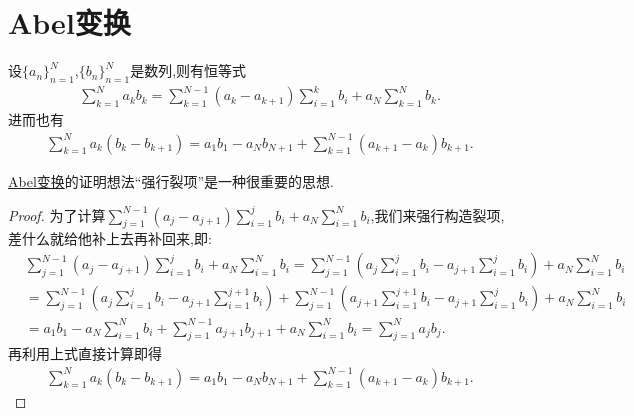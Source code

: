 \documentclass[../../main.tex]{subfiles}%
\begin{document}
\section{Abel变换}

\begin{theorem}[Abel变换]\label{theorem:Abel变换}
设\(\{a_n\}_{n = 1}^{N}\),\(\{b_n\}_{n = 1}^{N}\)是数列,则有恒等式
\begin{align*}
\sum\limits_{k = 1}^{N} a_k b_k = \sum\limits_{k = 1}^{N - 1} (a_k - a_{k + 1}) \sum\limits_{i = 1}^{k} b_i + a_N \sum\limits_{k = 1}^{N} b_k.
\end{align*}
进而也有
\begin{align*}
\sum_{k=1}^N{a_k\left( b_k-b_{k+1} \right)}=a_1b_1-a_Nb_{N+1}+\sum_{k=1}^{N-1}{\left( a_{k+1}-a_k \right) b_{k+1}}.
\end{align*}
\end{theorem}
\begin{note}
\hyperref[theorem:Abel变换]{Abel变换}的证明想法“强行裂项”是一种很重要的思想.
\end{note}
\begin{proof}
为了计算\(\sum\limits_{j = 1}^{N - 1} (a_j - a_{j + 1}) \sum\limits_{i = 1}^{j} b_i + a_N \sum\limits_{i = 1}^{N} b_i\),我们来强行构造裂项,差什么就给他补上去再补回来,即:
\begin{align*}
&\sum\limits_{j = 1}^{N - 1} (a_j - a_{j + 1}) \sum\limits_{i = 1}^{j} b_i + a_N \sum\limits_{i = 1}^{N} b_i = \sum\limits_{j = 1}^{N - 1} \left(a_j \sum\limits_{i = 1}^{j} b_i - a_{j + 1} \sum\limits_{i = 1}^{j} b_i\right) + a_N \sum\limits_{i = 1}^{N} b_i
\\
&= \sum\limits_{j = 1}^{N - 1} \left(a_j \sum\limits_{i =1}^{j} b_i - a_{j + 1} \sum\limits_{i = 1}^{j + 1} b_i\right) + \sum\limits_{j = 1}^{N - 1} \left(a_{j + 1} \sum\limits_{i = 1}^{j + 1} b_i - a_{j + 1} \sum\limits_{i = 1}^{j} b_i\right) + a_N \sum\limits_{i = 1}^{N} b_i
\\
&= a_1 b_1 - a_N \sum\limits_{i = 1}^{N} b_i + \sum\limits_{j = 1}^{N - 1} a_{j + 1} b_{j + 1} + a_N \sum\limits_{i = 1}^{N} b_i
= \sum\limits_{j = 1}^{N} a_j b_j.
\end{align*}
再利用上式直接计算即得
\begin{align*}
\sum_{k=1}^N{a_k\left( b_k-b_{k+1} \right)}=a_1b_1-a_Nb_{N+1}+\sum_{k=1}^{N-1}{\left( a_{k+1}-a_k \right) b_{k+1}}.
\end{align*}
\end{proof}
\end{document}
